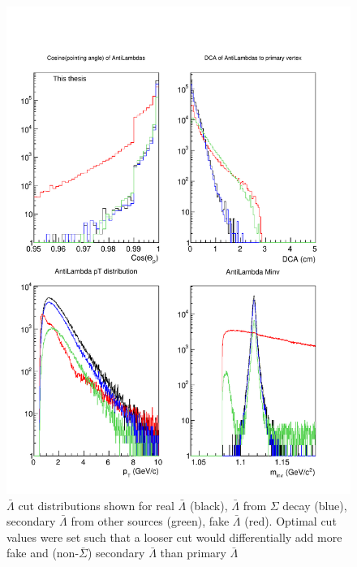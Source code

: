 \begin{figure}
\includegraphics[width=36pc]{Figures/2014-03-31-Distribution-AntiLambda-4Types-CosP-DCA-pT-Minv.pdf}
\caption[$\bar{\Lambda}$ cut distributions]{$\bar{\Lambda}$ cut distributions shown for real $\bar{\Lambda}$ (black), $\bar{\Lambda}$ from $\Sigma$ decay (blue), secondary $\bar{\Lambda}$ from other sources (green), fake $\bar{\Lambda}$ (red). Optimal cut values were set such that a looser cut would differentially add more fake and (non-$\bar{\Sigma}$) secondary $\bar{\Lambda}$ than primary $\bar{\Lambda}$}
\label{fig:AntiLambdaCutDists1}
\end{figure}

